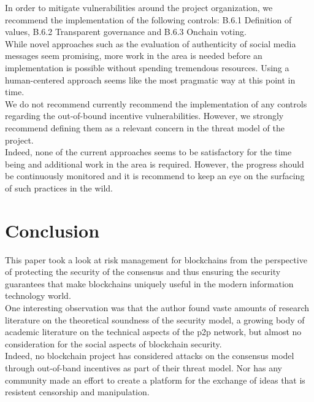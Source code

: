 \documentclass[12pt,a4paper]{article}
\begin{document}
In order to mitigate vulnerabilities around the project organization, we recommend the implementation of the following controls: B.6.1 Definition of values, B.6.2 Transparent governance and B.6.3 Onchain voting.\\

While novel approaches such as the evaluation of authenticity of social media messages seem promising, more work in the area is needed before an implementation is possible without spending tremendous resources. Using a human-centered approach seems like the most pragmatic way at this point in time.\\

We do not recommend currently recommend the implementation of any controls regarding the out-of-bound incentive vulnerabilities. However, we strongly recommend defining them as a relevant concern in the threat model of the project.\\

Indeed, none of the current approaches seems to be satisfactory for the time being and additional work in the area is required. However, the progress should be continuously monitored and it is recommend to keep an eye on the surfacing of such practices in the wild.\\

\section{Conclusion}

This paper took a look at risk management for \glspl{blockchain} from the perspective of protecting the security of the \gls{consensus} and thus ensuring the security guarantees that make \glspl{blockchain} uniquely useful in the modern information technology world.\\

One interesting observation was that the author found vaste amounts of research literature on the theoretical soundness of the security model, a growing body of academic literature on the technical aspects of the \acrshort{p2p} network, but almost no consideration for the social aspects of blockchain security.\\

Indeed, no blockchain project has considered attacks on the consensus model through out-of-band incentives as part of their threat model. Nor has any community made an effort to create a platform for the exchange of ideas that is resistent censorship and manipulation.\\
\end{document}

